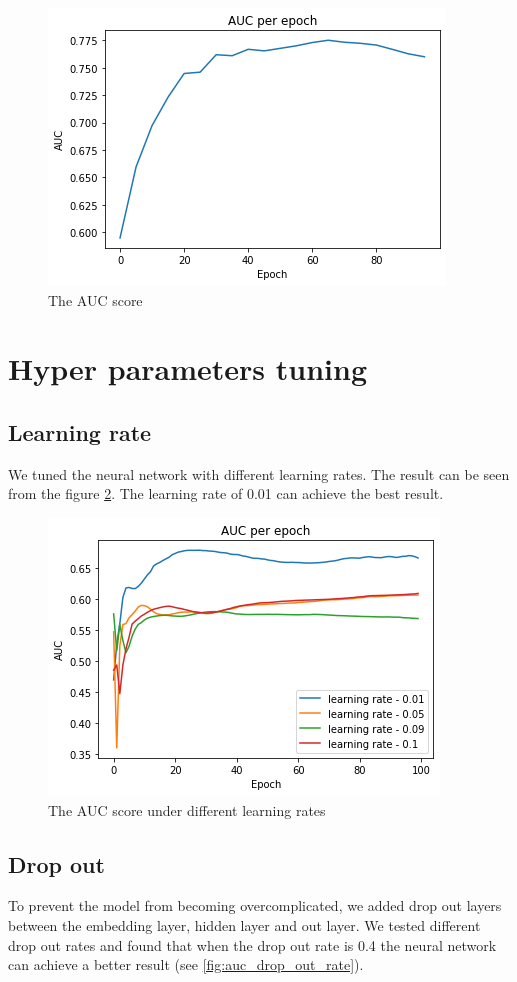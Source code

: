 \documentclass[11pt,twoside]{report}
\begin{document}
\begin{figure}[H]
    \centering
    \includegraphics[scale=0.9]{auc.png}
    \caption{The AUC score}
    \label{fig:auc}
\end{figure}

\section{Hyper parameters tuning}
\subsection{Learning rate}
We tuned the neural network with different learning rates. The result can be seen from the figure \ref{fig:auc_learning_rate}. The learning rate of 0.01 can achieve the best result.

\begin{figure}[H]
    \centering
    \includegraphics[scale=0.9]{auc_learning_rate.png}
    \caption{The AUC score under different learning rates}
    \label{fig:auc_learning_rate}
\end{figure}

\subsection{Drop out}
To prevent the model from becoming overcomplicated, we added drop out layers between the embedding layer, hidden layer and out layer. We tested different drop out rates and found that when the drop out rate is 0.4 the neural network can achieve a better result (see \ref{fig:auc_drop_out_rate}).
\end{document}
